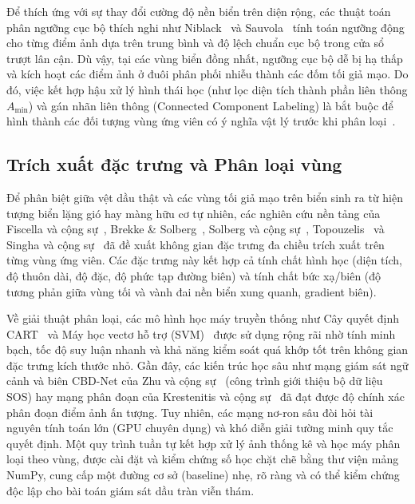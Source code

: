 Để thích ứng với sự thay đổi cường độ nền biển trên diện rộng, các thuật toán phân ngưỡng cục bộ thích nghi như Niblack~\cite{niblack1986introduction} và Sauvola~\cite{sauvola2000adaptive} tính toán ngưỡng động cho từng điểm ảnh dựa trên trung bình và độ lệch chuẩn cục bộ trong cửa sổ trượt lân cận. Dù vậy, tại các vùng biển đồng nhất, ngưỡng cục bộ dễ bị hạ thấp và kích hoạt các điểm ảnh ở đuôi phân phối nhiễu thành các đốm tối giả mạo. Do đó, việc kết hợp hậu xử lý hình thái học (như lọc diện tích thành phần liên thông $A_{\min}$) và gán nhãn liên thông (Connected Component Labeling) là bắt buộc để hình thành các đối tượng vùng ứng viên có ý nghĩa vật lý trước khi phân loại~\cite{topouzelis2008oil}.

\subsection{Trích xuất đặc trưng và Phân loại vùng}
Để phân biệt giữa vệt dầu thật và các vùng tối giả mạo trên biển sinh ra từ hiện tượng biển lặng gió hay màng hữu cơ tự nhiên, các nghiên cứu nền tảng của Fiscella và cộng sự~\cite{fiscella2000oil}, Brekke \& Solberg~\cite{brekke2005oil}, Solberg và cộng sự~\cite{solberg2007oil}, Topouzelis~\cite{topouzelis2008oil} và Singha và cộng sự~\cite{singha2013oil} đã đề xuất không gian đặc trưng đa chiều trích xuất trên từng vùng ứng viên. Các đặc trưng này kết hợp cả tính chất hình học (diện tích, độ thuôn dài, độ đặc, độ phức tạp đường biên) và tính chất bức xạ/biên (độ tương phản giữa vùng tối và vành đai nền biển xung quanh, gradient biên).

Về giải thuật phân loại, các mô hình học máy truyền thống như Cây quyết định CART~\cite{breiman1984classification} và Máy học vectơ hỗ trợ (SVM)~\cite{cortes1995support} được sử dụng rộng rãi nhờ tính minh bạch, tốc độ suy luận nhanh và khả năng kiểm soát quá khớp tốt trên không gian đặc trưng kích thước nhỏ. Gần đây, các kiến trúc học sâu như mạng giám sát ngữ cảnh và biên CBD-Net của Zhu và cộng sự~\cite{zhu2022oil} (công trình giới thiệu bộ dữ liệu SOS) hay mạng phân đoạn của Krestenitis và cộng sự~\cite{krestenitis2019oil} đã đạt được độ chính xác phân đoạn điểm ảnh ấn tượng. Tuy nhiên, các mạng nơ-ron sâu đòi hỏi tài nguyên tính toán lớn (GPU chuyên dụng) và khó diễn giải tường minh quy tắc quyết định. Một quy trình tuần tự kết hợp xử lý ảnh thống kê và học máy phân loại theo vùng, được cài đặt và kiểm chứng số học chặt chẽ bằng thư viện mảng NumPy, cung cấp một đường cơ sở (baseline) nhẹ, rõ ràng và có thể kiểm chứng độc lập cho bài toán giám sát dầu tràn viễn thám.

